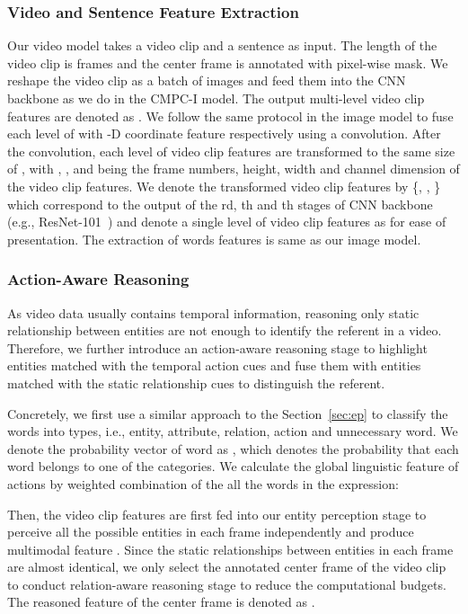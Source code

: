\documentclass[10pt,journal,cspaper,compsoc]{IEEEtran}
\begin{document}
\subsubsection{Video and Sentence Feature Extraction}
Our video model takes a video clip and a sentence as input. 
The length of the video clip is  frames and the center frame is annotated with pixel-wise mask. 
We reshape the video clip as a batch of images and feed them into the CNN backbone as we do in the CMPC-I model. 
The output multi-level video clip features are denoted as . 
We follow the same protocol in the image model to fuse each level of  with -D coordinate feature  respectively using a  convolution. 
After the convolution, each level of video clip features are transformed to the 
same size of , 
with , ,  and  being the frame numbers, height, width and channel dimension of the video clip features. 
We denote the transformed video clip features by \{, , \} which correspond to the output of the rd, th and th stages of CNN backbone (e.g., ResNet-101~\cite{he2016deep}) and denote a single level of video clip features as  for ease of presentation. 
The extraction of words features  is same as our image model.

\subsubsection{Action-Aware Reasoning}
As video data usually contains temporal information, reasoning only static relationship between entities are not enough to identify the referent in a video. 
Therefore, we further introduce an action-aware reasoning stage to highlight entities matched with the temporal action cues and fuse them with entities matched with the static relationship cues to distinguish the referent. 

Concretely, we first use a similar approach to the Section~\ref{sec:ep} to classify the words into  types, i.e., entity, attribute, relation, action and unnecessary word. 
We denote the probability vector of word  as , which denotes the probability that each word belongs to one of the  categories. 
We calculate the global linguistic feature of actions  by weighted combination of the all the words in the expression: 


Then, the video clip features  are first fed into our entity perception stage to perceive all the possible entities in each frame independently and produce multimodal feature . 
Since the static relationships between entities in each frame are almost identical, we only select the annotated center frame of the video clip to conduct relation-aware reasoning stage to reduce the computational budgets. The reasoned feature of the center frame is denoted as .
\end{document}
